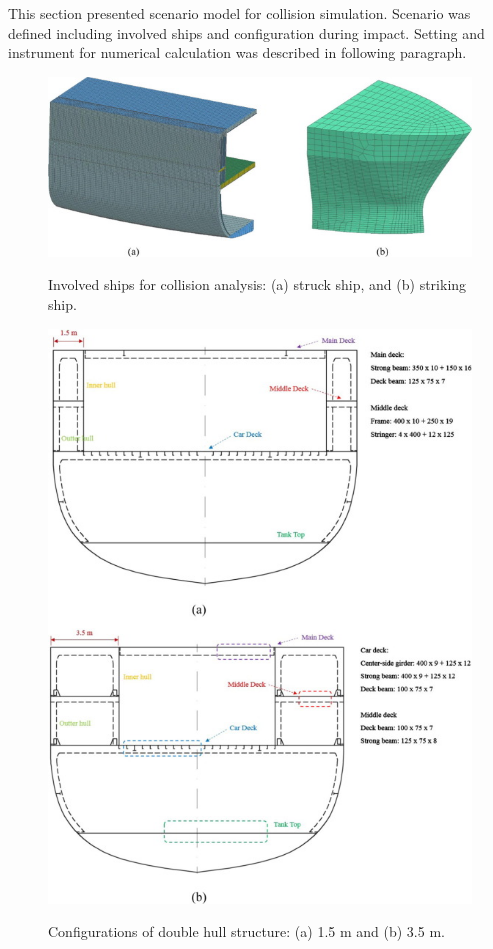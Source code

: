 \documentclass[../Final.tex]{subfiles}
\begin{document}
This section presented scenario model for collision simulation. 
Scenario was defined including involved ships and configuration during impact. Setting and instrument for numerical calculation was described in following paragraph. 

\begin{figure}[h]
    \centering
    \includegraphics[width=\textwidth]{fig1.jpg}
    \label{fig1}
    \caption{Involved ships for collision analysis: (a) struck ship, and (b) striking ship.}
\end{figure}

\begin{figure}[h]
    \centering
    \includegraphics[width=\columnwidth]{fig2.jpg}
    \label{fig2}
    \caption{Configurations of double hull structure: (a) 1.5 m and (b) 3.5 m.}
\end{figure}
\end{document}
